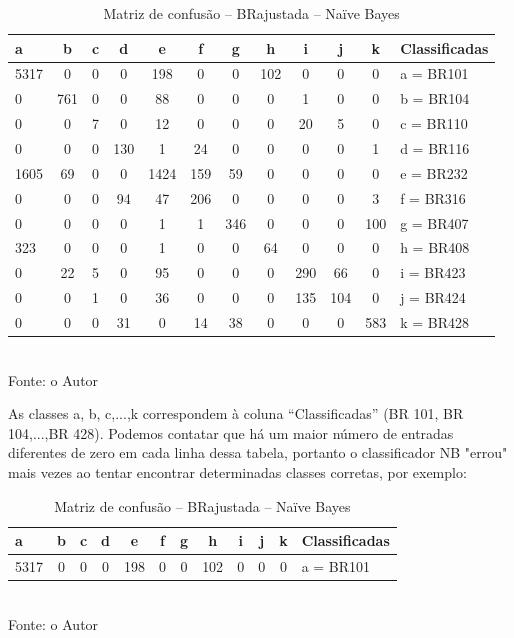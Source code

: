 	\begin{table}[!ht]
		\centering
		\caption{Matriz de confusão -- BRajustada -- Naïve Bayes}
		\vspace{1mm}
		\begin{tabular}{l|c|c|c|c|c|c|c|c|c|c|l}
			\hline
			\textbf{a} & \textbf{b} & \textbf{c} & \textbf{d} & \textbf{e} & \textbf{f} & \textbf{g} & \textbf{h} & 
			\textbf{i} & \textbf{j} & \textbf{k} & 		\textbf{Classificadas}\\
			\hline
			 5317 &  0  &  0 &  0 & 198 & 0  & 0 & 102 &   0  &  0  &  0 &   a = BR101\\
			 0 & 761 &  0 &  0 & 88 &  0  & 0 &   0 &   1  &  0  &  0 &   b = BR104\\
			 0 &  0  &  7 &  0 & 12 &  0  & 0 &   0 &  20  &  5  &  0 &   c = BR110\\
			 0 &   0 &  0 & 130 & 1 & 24  & 0 &   0 &   0  &  0  &  1 &   d = BR116\\
			 1605 &  69 &  0 &  0 & 1424 & 159 &   59  &  0   &  0  &  0 & 0 &  e = BR232\\
			 0 &   0 &  0 & 94 & 47 & 206 & 0 &   0 &   0  &  0  &  3 &   f = BR316\\
			 0 &   0 &  0 &  0 &  1 &  1 & 346 &  0 &   0  &  0 & 100 &   g = BR407\\
			 323 &   0 &  0 &  0 &  1 &  0 &  0 &  64 &   0  &  0  &  0 &   h = BR408\\
			 0 &  22 &  5 &  0 &  95 & 0 &  0 &   0 & 290  & 66  &  0 &   i = BR423\\
			 0 &   0 &  1 &  0 &  36 & 0 &  0 &   0 & 135  & 104 &  0 &   j = BR424\\
			 0 &   0 &  0 & 31 &  0  & 14 & 38 &  0 &   0  & 0 & 583 &    k = BR428\\			
		\end{tabular}
		\\
		\tiny Fonte: o Autor
	\end{table}	

As classes a, b, c,...,k correspondem à coluna ``Classificadas'' (BR 101, BR 104,...,BR 428). 
Podemos contatar que há um maior número de entradas diferentes de zero em cada linha dessa tabela, portanto o classificador NB "errou" mais vezes ao tentar encontrar determinadas classes corretas, por exemplo:

	\begin{table}[!ht]
		\centering
		\caption{Matriz de confusão -- BRajustada -- Naïve Bayes}
		\vspace{1mm}
		\begin{tabular}{l|c|c|c|c|c|c|c|c|c|c|l}
			\hline
			\textbf{a} & \textbf{b} & \textbf{c} & \textbf{d} & \textbf{e} & \textbf{f} & \textbf{g} & \textbf{h} & 
			\textbf{i} & \textbf{j} & \textbf{k} & 		\textbf{Classificadas}\\
			\hline
			5317 &  0  &  0 &  0 & 198 & 0  & 0 & 102 &   0  &  0  &  0 &   a = BR101			
		\end{tabular}
		\\
		\tiny Fonte: o Autor
	\end{table}	

